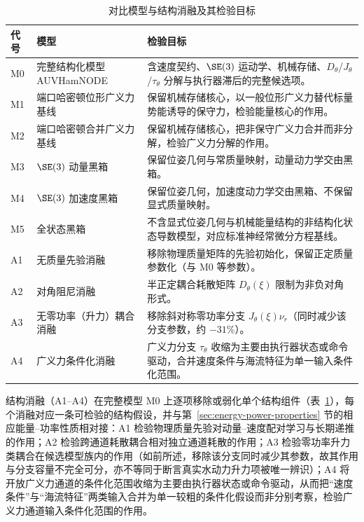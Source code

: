 \begin{table}[htbp]
  \centering
  \caption{对比模型与结构消融及其检验目标}
  \label{tab:model-comparison-roles}
  \begin{tabularx}{\textwidth}{l>{\raggedright\arraybackslash}p{}>{\raggedright\arraybackslash}X}
    \toprule
    代号 & 模型 & 检验目标 \\
    \midrule
    M0 & 完整结构化模型 AUVHamNODE & 含速度契约、\(\SE(3)\) 运动学、机械存储、\(D_\theta\)/\(J_\theta\)/\(\tau_\theta\) 分解与执行器滞后的完整候选项。 \\
    M1 & 端口哈密顿位形广义力基线 & 保留机械存储核心，以一般位形广义力替代标量势能诱导的保守力，检验能量核心的作用。 \\
    M2 & 端口哈密顿合并广义力基线 & 保留机械存储核心，把非保守广义力合并而非分解，检验广义力分解的作用。 \\
    M3 & \(\SE(3)\) 动量黑箱 & 保留位姿几何与常质量映射，动量动力学交由黑箱。 \\
    M4 & \(\SE(3)\) 加速度黑箱 & 保留位姿几何，加速度动力学交由黑箱、不保留显式质量映射。 \\
    M5 & 全状态黑箱 & 不含显式位姿几何与机械能量结构的非结构化状态导数模型，对应标准神经常微分方程基线。 \\
    \midrule
    A1 & 无质量先验消融 & 移除物理质量矩阵的先验初始化，保留正定质量参数化（与 M0 等参数）。 \\
    A2 & 对角阻尼消融 & 半正定耦合耗散矩阵 \(D_\theta(\xi)\) 限制为非负对角形式。 \\
    A3 & 无零功率（升力）耦合消融 & 移除斜对称零功率分支 \(J_\theta(\xi)\nu_r\)（同时减少该分支参数，约 \(-31\%\)）。 \\
    A4 & 广义力条件化消融 & 广义力分支 \(\tau_\theta\) 收缩为主要由执行器状态或命令驱动，合并速度条件与海流特征为单一输入条件化范围。 \\
    \bottomrule
  \end{tabularx}
\end{table}

结构消融（A1--A4）在完整模型 M0 上逐项移除或弱化单个结构组件（表~\ref{tab:model-comparison-roles}），每个消融对应一条可检验的结构假设，并与第~\ref{sec:energy-power-properties} 节的相应能量--功率性质相对接：A1 检验物理质量先验对动量--速度配对学习与长期递推的作用；A2 检验跨通道耗散耦合相对独立通道耗散的作用；A3 检验零功率升力类耦合在候选模型族内的作用（如前所述，移除该分支同时减少其参数，故其作用与分支容量不完全可分，亦不等同于断言真实水动力升力项被唯一辨识）；A4 将开放广义力通道的条件化范围收缩为主要由执行器状态或命令驱动，从而把“速度条件”与“海流特征”两类输入合并为单一较粗的条件化假设而非分别考察，检验广义力通道输入条件化范围的作用。

